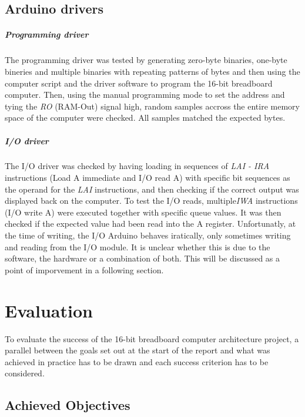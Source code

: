 \section{Arduino drivers}
\paragraph{Programming driver}
The programming driver was tested by generating zero-byte binaries, one-byte bineries and multiple
binaries with repeating patterns of bytes and then using the computer script and the driver software
to program the 16-bit breadboard computer. Then, using the manual programming mode to set the address
and tying the \emph{RO} (RAM-Out) signal high, random samples accross the entire memory space of the
computer were checked. All samples matched the expected bytes.

\paragraph{I/O driver}
The I/O driver was checked by having loading in sequences of \emph{LAI - IRA} instructions (Load A
immediate and I/O read A) with specific bit sequences as the operand for the \emph{LAI} instructions,
and then checking if the correct output was displayed back on the computer. To test the I/O reads,
multiple\emph{IWA} instructions (I/O write A) were executed together with specific queue values. It
was then checked if the expected value had been read into the A register. Unfortunatly,
at the time of writing, the I/O Arduino behaves iratically, only sometimes writing and reading from the
I/O module. It is unclear whether this is due to the software, the hardware or a combination of both.
This will be discussed as a point of imporvement in a following section.



\chapter{Evaluation}
To evaluate the success of the 16-bit breadboard computer architecture project, a parallel between
the goals set out at the start of the report and what was achieved in practice has to be drawn and
each success criterion has to be considered.

\section{Achieved Objectives}

